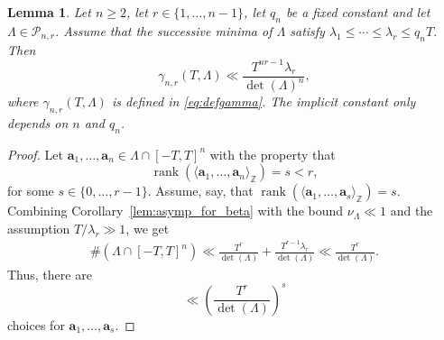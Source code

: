 \documentclass[11pt,reqno]{amsart}
\newtheorem{lem}[thm]{Lemma}
\theoremstyle{definition}
\theoremstyle{remark}
\numberwithin{equation}{section}
\numberwithin{thm}{section}
\numberwithin{table}{section}
\def \Z {{\mathbb Z}}
\def\a{\mathbf{a}}
\DeclareMathOperator{\rank}{rank}
\begin{document}
\begin{lem}\label{lem:gammabound}
          Let $n \ge 2$, let $r \in \{ 1, \ldots, n-1\}$, let $q_n$ be a fixed constant and let 
     $\Lambda \in \mathcal{P}_{n,r}$.
Assume that the successive minima of $\Lambda$ satisfy  
$\lambda_1  \le \cdots \le \lambda_r \le q_nT$. Then 
        \[
        \gamma_{n,r}(T, \Lambda) \ll \frac{T^{nr-1} \lambda_r}{\det(\Lambda)^n},
        \]
        where $\gamma_{n,r}(T, \Lambda)$ is defined in \eqref{eq:defgamma}. 
        The implicit constant only depends on $n$ and $q_n$. 
    \end{lem}

     \begin{proof}
        Let $\a_1, \ldots, \a_n \in \Lambda \cap [-T,T]^n$ with the property that \[
        \rank(\langle \a_1, \ldots, \a_n \rangle_{\Z}) = s < r,
        \] 
        for some $s\in \{0,\ldots,r-1\}$.
        Assume, say, that $\rank(\langle \a_1, \ldots, \a_s \rangle_{\Z}) = s$. 
         Combining Corollary~\ref{lem:asymp_for_beta} with the bound  $\nu_\Lambda \ll 1$ and the assumption $T/\lambda_r \gg 1$, we get
        \begin{align*}
            \# (\Lambda \cap [-T,T]^n) 
        \ll \frac{T^r}{\det (\Lambda)} +  \frac{T^{r-1}\lambda_r}{\det (\Lambda)}
        \ll  \frac{T^r}{\det (\Lambda)}.
        \end{align*} 
        Thus, there are 
        \[
        \ll  \left( \frac{T^r}{\det (\Lambda)}\right)^s
        \]
        choices for $\a_1,\ldots,\a_s$.
        

\end{proof}
\end{document}
